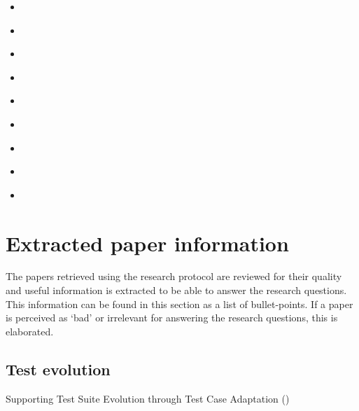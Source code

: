 \documentclass[]{book}
\providecommand{\tightlist}{%
  \setlength{\itemsep}{0pt}\setlength{\parskip}{0pt}}
\begin{document}
\begin{itemize}
  \begin{itemize}
  \tightlist
  \item
    \citet{hemmati2018}
  \item
    \citet{shamshiri2018automatically}
  \item
    \citet{vernotte2015}
  \item
    \citet{noor2015test}
  \item
    \citet{supportingtestsuite}
  \item
    \citet{bowring2014obsidian}
  \item
    \citet{leung2015testing}
  \item
    \citet{greiler2013}
  \item
    \citet{atifi2017}
  \end{itemize}
\end{itemize}

\section{Extracted paper information}\label{extracted-paper-information}

The papers retrieved using the research protocol are reviewed for their
quality and useful information is extracted to be able to answer the
research questions. This information can be found in this section as a
list of bullet-points. If a paper is perceived as `bad' or irrelevant
for answering the research questions, this is elaborated.

\subsection{Test evolution}\label{test-evolution}

Supporting Test Suite Evolution through Test Case Adaptation
(\citet{supportingtestsuite})
\end{document}
